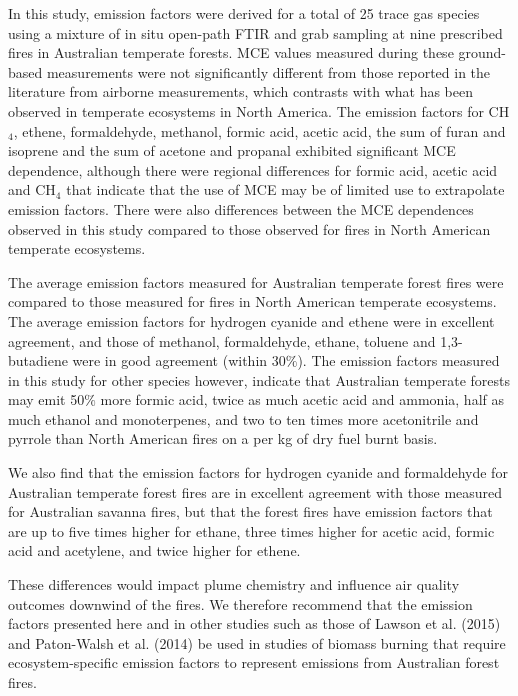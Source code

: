\documentclass[acp, manuscript]{copernicus}
\begin{document}
In this study, emission factors were derived for a total of 25 trace gas species using a mixture of in situ open-path FTIR and grab sampling at nine prescribed fires in Australian temperate forests. MCE values measured during these ground-based measurements were not significantly different from those reported in the literature from airborne measurements, which contrasts with what has been observed in temperate ecosystems in North America. The emission factors for CH$_4$, ethene, formaldehyde, methanol, formic acid, acetic acid, the sum of furan and isoprene and the sum of acetone and propanal exhibited significant MCE dependence, although there were regional differences for formic acid, acetic acid and CH$_4$ that indicate that the use of MCE may be of limited use to extrapolate emission factors. There were also differences between the MCE dependences observed in this study compared to those observed for fires in North American temperate ecosystems. 

The average emission factors measured for Australian temperate forest fires were compared to those measured for fires in North American temperate ecosystems. The average emission factors for hydrogen cyanide and ethene were in excellent agreement, and those of methanol, formaldehyde, ethane, toluene and 1,3-butadiene were in good agreement (within 30$\%$). The emission factors measured in this study for other species however, indicate that Australian temperate forests may emit 50$\%$ more formic acid, twice as much acetic acid and ammonia, half as much ethanol and monoterpenes, and two to ten times more acetonitrile and pyrrole than North American fires on a per kg of dry fuel burnt basis.

We also find that the emission factors for hydrogen cyanide and formaldehyde for Australian temperate forest fires are in excellent agreement with those measured for Australian savanna fires, but that the forest fires have emission factors that are up to five times higher for ethane, three times higher for acetic acid, formic acid and acetylene, and twice higher for ethene. 

These differences would impact plume chemistry and influence air quality outcomes downwind of the fires. We therefore recommend that the emission factors presented here and in other studies such as those of Lawson et al. (2015) and Paton-Walsh et al. (2014) be used in studies of biomass burning that require ecosystem-specific emission factors to represent emissions from Australian forest fires.  
\end{document}
